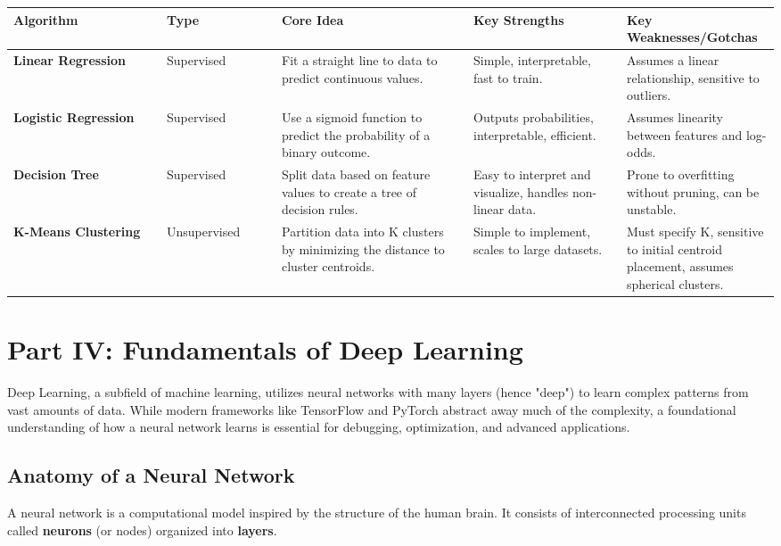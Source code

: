 \documentclass[11pt,a4paper]{article}
\begin{document}
\begin{longtable}{@{}p{0.2\linewidth}p{0.15\linewidth}p{0.25\linewidth}p{0.2\linewidth}p{0.2\linewidth}@{}}
\toprule
\textbf{Algorithm} & \textbf{Type} & \textbf{Core Idea} & \textbf{Key Strengths} & \textbf{Key Weaknesses/Gotchas} \\
\midrule
\endhead
\textbf{Linear Regression} & Supervised & Fit a straight line to data to predict continuous values. & Simple, interpretable, fast to train. & Assumes a linear relationship, sensitive to outliers. \\
\textbf{Logistic Regression} & Supervised & Use a sigmoid function to predict the probability of a binary outcome. & Outputs probabilities, interpretable, efficient. & Assumes linearity between features and log-odds. \\
\textbf{Decision Tree} & Supervised & Split data based on feature values to create a tree of decision rules. & Easy to interpret and visualize, handles non-linear data. & Prone to overfitting without pruning, can be unstable. \\
\textbf{K-Means Clustering} & Unsupervised & Partition data into K clusters by minimizing the distance to cluster centroids. & Simple to implement, scales to large datasets. & Must specify K, sensitive to initial centroid placement, assumes spherical clusters. \\
\bottomrule
\end{longtable}

\section{Part IV: Fundamentals of Deep Learning}

Deep Learning, a subfield of machine learning, utilizes neural networks with many layers (hence "deep") to learn complex patterns from vast amounts of data. While modern frameworks like TensorFlow and PyTorch abstract away much of the complexity, a foundational understanding of how a neural network learns is essential for debugging, optimization, and advanced applications.

\subsection{Anatomy of a Neural Network}

A neural network is a computational model inspired by the structure of the human brain. It consists of interconnected processing units called \textbf{neurons} (or nodes) organized into \textbf{layers}.
\end{document}
